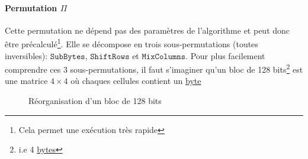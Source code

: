 \documentclass[a4paper, 12pt]{article}
\begin{document}
\paragraph{Permutation $\Pi$}\label{permutPi}
Cette permutation ne dépend pas des paramètres de l'algorithme et peut donc être précalculé\footnote{Cela permet une exécution très rapide}. Elle se décompose en trois sous-permutations (toutes inversibles): $\hyperref[subbytes]{\mathtt{SubBytes}}$, $\hyperref[shiftrows]{\mathtt{ShiftRows}}$ et $\hyperref[mixcolumns]{\mathtt{MixColumns}}$. Pour plus facilement comprendre ces 3 sous-permutations, il faut s'imaginer qu'un bloc de 128 bits\footnote{i.e 4 \hyperref[byte]{bytes}} est une matrice $4\times4$ où chaques cellules contient un \hyperref[byte]{byte}

\begin{figure}[h]
\centering
{}
\caption{Réorganisation d'un bloc de 128 bits}
\label{reorg_entre}
\end{figure}
\end{document}
